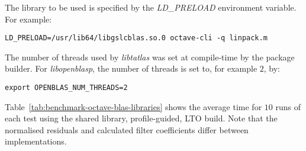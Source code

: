 \documentclass[a4paper,twoside,10pt,english]{report}
\begin{document}
The library to be used is specified by the \emph{LD\_PRELOAD} environment 
variable. For example:
\begin{small}
\begin{verbatim}
LD_PRELOAD=/usr/lib64/libgslcblas.so.0 octave-cli -q linpack.m
\end{verbatim}
\end{small}

The number of threads used by \emph{libtatlas} was set at compile-time by the
package builder. For \emph{libopenblasp}, the number of threads is set to, for 
example $2$, by:
\begin{small}
\begin{verbatim}
export OPENBLAS_NUM_THREADS=2
\end{verbatim}
\end{small}

Table~\ref{tab:benchmark-octave-blas-libraries} shows the average time for $10$
runs of each test using the shared library, profile-guided, LTO build.  Note
that the normalised residuals and calculated filter coefficients differ between
implementations.  
\end{document}
